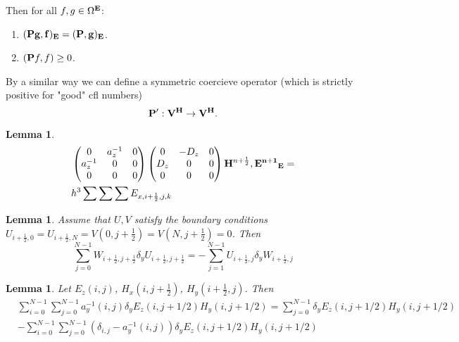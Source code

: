 \documentclass[12pt,reqno]{amsart}
\newtheorem{lem}[theorem]{Lemma}
\newtheorem{lemma}[theorem]{Lemma}
\theoremstyle{definition}
\numberwithin{equation}{section}
\def\Gw{\Omega}     \def\Gx{\Xi}         \def\Gy{\Psi}
\begin{document}
	Then for all $f,g\in \Gw^{\bf{E}}$:
	\begin{enumerate}
		\item $(\bf{P}g,f)_{\bf{E}}=(\bf{P},g)_{\bf{E}}$.
		\item $({\bf P}f,f)\geq 0$. 
	\end{enumerate}
By a similar way we can define  a symmetric coercieve operator
(which is strictly positive for "good" cfl numbers)
	$$
\bf{P}':V^{\bf{H}}\to V^{\bf{H}}.
$$
\begin{lemma}
	\begin{align*}
		&
\begin{pmatrix}
	0& a_z^{-1}&0 \\
	a_z^{-1}& 0& 0\\
	0&0&0
\end{pmatrix}
\begin{pmatrix}
	0& -D_z&0 \\
	D_z& 0& 0\\
	0&0&0
\end{pmatrix}
{\bf H}^{n+\frac{1}{2}},{\bf E^{n+1}}_{\bf{E}}=\\&
h^3\sum\sum\sum E_{x,i+\frac{1}{2},j,k}
\end{align*}

\end{lemma}
\begin{lem}
	Assume that $U,V$ satisfy the boundary conditions 
	$U_{i+\frac{1}{2},0}=U_{i+\frac{1}{2},N}=V(0,j+\frac{1}{2})=V(N,j+\frac{1}{2})=0$.
	Then
	$$
	\sum_{j=0}^{N-1}W_{i+\frac{1}{2},j+\frac{1}{2}}\delta_yU_{i+\frac{1}{2},j+\frac{1}{2}}=
	-\sum_{j=1}^{N-1}U_{i+\frac{1}{2},j}\delta_y W_{i+\frac{1}{2},j}
	$$
\end{lem}
\begin{lem}
	Let $E_z(i,j)$, $H_x(i,j+\frac{1}{2})$, $H_y(i+\frac{1}{2},j)$.
Then
	\begin{align*}
		&
\sum_{i=0}^{N-1}	\sum_{j=0}^{N-1}a_y^{-1}(i,j)\delta_yE_z(i,j+1/2)H_y(i,j+1/2)=
\sum_{j=0}^{N-1}\delta_yE_z(i,j+1/2)H_y(i,j+1/2)\\&
-\sum_{i=0}^{N-1}	\sum_{j=0}^{N-1}(\delta_{i,j}-a_y^{-1}(i,j))\delta_yE_z(i,j+1/2)H_y(i,j+1/2)
	\end{align*}
\end{lem}
\end{document}
